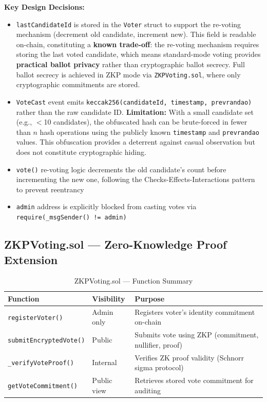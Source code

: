 \documentclass[oneside,a4paper,12pt]{book}
\begin{document}
\textbf{Key Design Decisions:}
\begin{itemize}[leftmargin=1.5cm]
    \item \texttt{lastCandidateId} is stored in the \texttt{Voter} struct to support the re-voting mechanism (decrement old candidate, increment new). This field is readable on-chain, constituting a \textbf{known trade-off}: the re-voting mechanism requires storing the last voted candidate, which means standard-mode voting provides \textbf{practical ballot privacy} rather than cryptographic ballot secrecy. Full ballot secrecy is achieved in ZKP mode via \texttt{ZKPVoting.sol}, where only cryptographic commitments are stored.
    \item \texttt{VoteCast} event emits \texttt{keccak256(candidateId, timestamp, prevrandao)} rather than the raw candidate ID. \textbf{Limitation:} With a small candidate set (e.g., $<$10 candidates), the obfuscated hash can be brute-forced in fewer than $n$ hash operations using the publicly known \texttt{timestamp} and \texttt{prevrandao} values. This obfuscation provides a deterrent against casual observation but does not constitute cryptographic hiding.
    \item \texttt{vote()} re-voting logic decrements the old candidate's count before incrementing the new one, following the Checks-Effects-Interactions pattern to prevent reentrancy
    \item \texttt{admin} address is explicitly blocked from casting votes via \texttt{require(\_msgSender() != admin)}
\end{itemize}

\subsection{ZKPVoting.sol --- Zero-Knowledge Proof Extension}

\begin{table}[htbp]
\centering
\renewcommand{\arraystretch}{1.2}
\small
\begin{tabularx}{\textwidth}{|p{4cm}|p{2.5cm}|X|}
\hline
\textbf{Function} & \textbf{Visibility} & \textbf{Purpose} \\
\hline
\texttt{registerVoter()} & Admin only & Registers voter's identity commitment on-chain \\
\hline
\texttt{submitEncryptedVote()} & Public & Submits vote using ZKP (commitment, nullifier, proof) \\
\hline
\texttt{\_verifyVoteProof()} & Internal & Verifies ZK proof validity (Schnorr sigma protocol) \\
\hline
\texttt{getVoteCommitment()} & Public view & Retrieves stored vote commitment for auditing \\
\hline
\end{tabularx}
\caption{ZKPVoting.sol --- Function Summary}
\label{tab:zkpvoting}
\end{table}
\end{document}

